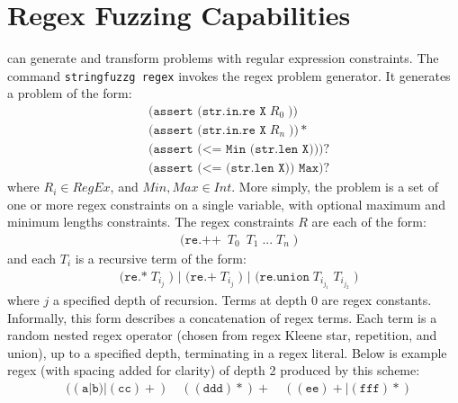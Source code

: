 


    \section{Regex Fuzzing Capabilities}
    \vspace{-0.1in}
        \fuzzer{} can generate and transform problems with regular expression constraints. The command \texttt{stringfuzzg regex} invokes the regex problem generator. It generates a problem of the form: %
        \begingroup
        \footnotesize
        \begin{align*}
            & \texttt{(assert (str.in.re X}\; R_0\; \texttt{))} \\
            & \texttt{(assert (str.in.re X}\; R_n\; \texttt{))}* \\
            & \texttt{(assert (<= Min (str.len X)))}? \\
            & \texttt{(assert (<= (str.len X)) Max)}?
        \end{align*}
        \endgroup
        where $R_i \in RegEx$, and $Min, Max \in Int$. More simply, the problem is a set of one or more regex constraints on a single variable, with optional maximum and minimum lengths constraints. The regex constraints $R$ are each of the form:
        \begingroup
        \footnotesize
        \begin{align*}
            & \texttt{(re.++}\; \ T_0\; \  T_1\; \texttt{...}\; T_n\; \texttt{)}
        \end{align*}
        \endgroup
        and each $T_i$ is a recursive term of the form:
        \begingroup
        \footnotesize
        \begin{align*}
            & \texttt{(re.*}\; T_{i_j}\; \texttt{) | (re.+}\; T_{i_j}\; \texttt{) | (re.union}\; T_{i_{j_1}}\; T_{i_{j_2}}\; \texttt{)}
        \end{align*}
        \endgroup
        where $j$ a specified depth of recursion. Terms at depth 0 are regex constants. Informally, this form describes a concatenation of regex terms. Each term is a random nested regex operator (chosen from regex Kleene star, repetition, and union), up to a specified depth, terminating in a regex literal. Below is example regex (with spacing added for clarity) of depth 2 produced by this scheme:
        \begingroup
        \footnotesize
        \begin{align*}
            & ((\texttt{a}|\texttt{b})|(\texttt{cc})+)\quad ((\texttt{ddd})*)+\quad ((\texttt{ee})+|(\texttt{fff})*)
        \end{align*}
        \endgroup

